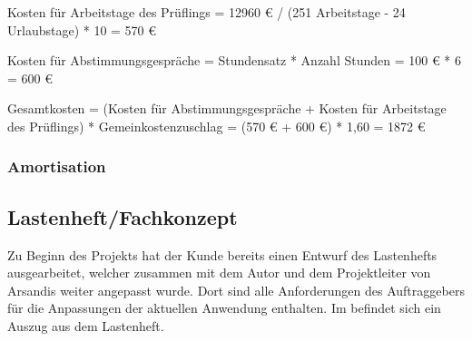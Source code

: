 Kosten für Arbeitstage des Prüflings = 12960 € / (251 Arbeitstage - 24 Urlaubstage) * 10 = 570 €

Kosten für Abstimmungsgespräche = Stundensatz * Anzahl Stunden = 100 € * 6 = 600 €

Gesamtkosten = (Kosten für Abstimmungsgespräche + Kosten für Arbeitstage des Prüflings) * Gemeinkostenzuschlag = (570 € + 600 €) * 1,60 = 1872 €

\subsubsection{Amortisation} %


\subsection{Lastenheft/Fachkonzept}
\label{sec:Lastenheft}
Zu Beginn des Projekts hat der Kunde bereits einen Entwurf des Lastenhefts ausgearbeitet, welcher zusammen mit dem Autor und dem Projektleiter von Arsandis weiter angepasst wurde.
Dort sind alle Anforderungen des Auftraggebers für die Anpassungen der aktuellen Anwendung enthalten.
Im  befindet sich ein Auszug aus dem Lastenheft.
